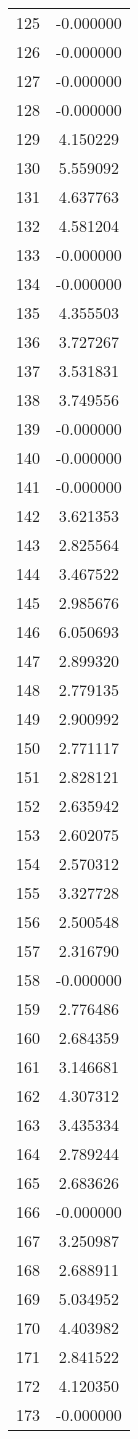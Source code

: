 \documentclass[12pt]{article}
\begin{document}
\begin{longtable}{@{}cc@{}}
125 & -0.000000 \\
126 & -0.000000 \\
127 & -0.000000 \\
128 & -0.000000 \\
129 & 4.150229 \\
130 & 5.559092 \\
131 & 4.637763 \\
132 & 4.581204 \\
133 & -0.000000 \\
134 & -0.000000 \\
135 & 4.355503 \\
136 & 3.727267 \\
137 & 3.531831 \\
138 & 3.749556 \\
139 & -0.000000 \\
140 & -0.000000 \\
141 & -0.000000 \\
142 & 3.621353 \\
143 & 2.825564 \\
144 & 3.467522 \\
145 & 2.985676 \\
146 & 6.050693 \\
147 & 2.899320 \\
148 & 2.779135 \\
149 & 2.900992 \\
150 & 2.771117 \\
151 & 2.828121 \\
152 & 2.635942 \\
153 & 2.602075 \\
154 & 2.570312 \\
155 & 3.327728 \\
156 & 2.500548 \\
157 & 2.316790 \\
158 & -0.000000 \\
159 & 2.776486 \\
160 & 2.684359 \\
161 & 3.146681 \\
162 & 4.307312 \\
163 & 3.435334 \\
164 & 2.789244 \\
165 & 2.683626 \\
166 & -0.000000 \\
167 & 3.250987 \\
168 & 2.688911 \\
169 & 5.034952 \\
170 & 4.403982 \\
171 & 2.841522 \\
172 & 4.120350 \\
173 & -0.000000 \\

\end{longtable}
\end{document}
